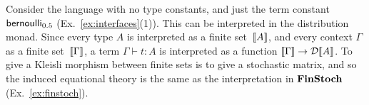 Consider the language with no type constants, and just the term constant $\mathsf{bernoulli}_{0.5}$ (Ex.~\ref{ex:interfaces}(1)).
This can be interpreted in the distribution monad.
Since every type $A$ is interpreted as a finite set~$\llbracket A\rrbracket$, and every context $\Gamma$ as a finite set~$\llbracket \Gamma\rrbracket$,
a term $\Gamma \vdash t:A$ is interpreted as a function $\llbracket \Gamma\rrbracket\to \mathcal{D}\llbracket A\rrbracket$.
To give a Kleisli morphism between finite sets is to give a stochastic matrix, and so the induced equational theory is the same as
the interpretation in $\mathbf{FinStoch}$ (Ex.~\ref{ex:finstoch}). 
